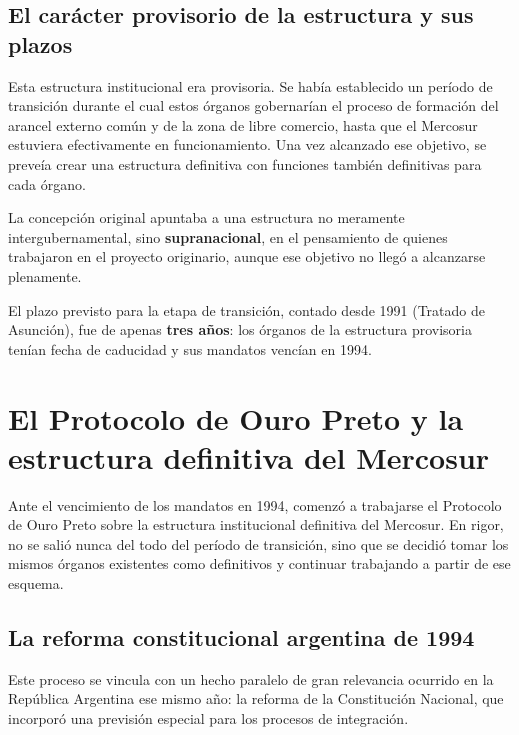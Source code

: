 \documentclass[12pt,oneside]{book}
\begin{document}
\subsection{El carácter provisorio de la estructura y sus plazos}

Esta estructura institucional era provisoria. Se había establecido un período de transición durante el cual estos órganos gobernarían el proceso de formación del arancel externo común y de la zona de libre comercio, hasta que el Mercosur estuviera efectivamente en funcionamiento. Una vez alcanzado ese objetivo, se preveía crear una estructura definitiva con funciones también definitivas para cada órgano.

\begin{important}
La concepción original apuntaba a una estructura no meramente intergubernamental, sino \textbf{supranacional}, en el pensamiento de quienes trabajaron en el proyecto originario, aunque ese objetivo no llegó a alcanzarse plenamente.
\end{important}

El plazo previsto para la etapa de transición, contado desde 1991 (Tratado de Asunción), fue de apenas \textbf{tres años}: los órganos de la estructura provisoria tenían fecha de caducidad y sus mandatos vencían en 1994.

\section{El Protocolo de Ouro Preto y la estructura definitiva del Mercosur}

Ante el vencimiento de los mandatos en 1994, comenzó a trabajarse el Protocolo de Ouro Preto sobre la estructura institucional definitiva del Mercosur. En rigor, no se salió nunca del todo del período de transición, sino que se decidió tomar los mismos órganos existentes como definitivos y continuar trabajando a partir de ese esquema.

\subsection{La reforma constitucional argentina de 1994}

Este proceso se vincula con un hecho paralelo de gran relevancia ocurrido en la República Argentina ese mismo año: la reforma de la Constitución Nacional, que incorporó una previsión especial para los procesos de integración.
\end{document}
